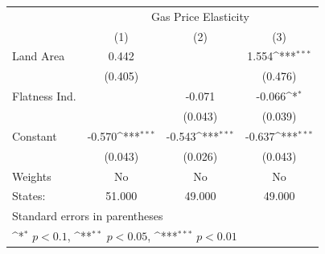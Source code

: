 {
\def\sym#1{\ifmmode^{#1}\else\(^{#1}\)\fi}
\begin{tabular}{l*{3}{c}}
\hline\hline
            &\multicolumn{3}{c}{Gas Price Elasticity}                         \\
            &\multicolumn{1}{c}{(1)}         &\multicolumn{1}{c}{(2)}         &\multicolumn{1}{c}{(3)}         \\
\hline
Land Area   &       0.442         &                     &       1.554\sym{***}\\
            &     (0.405)         &                     &     (0.476)         \\
[1em]
Flatness Ind.&                     &      -0.071         &      -0.066\sym{*}  \\
            &                     &     (0.043)         &     (0.039)         \\
[1em]
Constant    &      -0.570\sym{***}&      -0.543\sym{***}&      -0.637\sym{***}\\
            &     (0.043)         &     (0.026)         &     (0.043)         \\
\hline
Weights     &          No         &          No         &          No         \\
States:     &      51.000         &      49.000         &      49.000         \\
\hline\hline
\multicolumn{4}{l}{\footnotesize Standard errors in parentheses}\\
\multicolumn{4}{l}{\footnotesize \sym{*} \(p<0.1\), \sym{**} \(p<0.05\), \sym{***} \(p<0.01\)}\\
\end{tabular}
}
